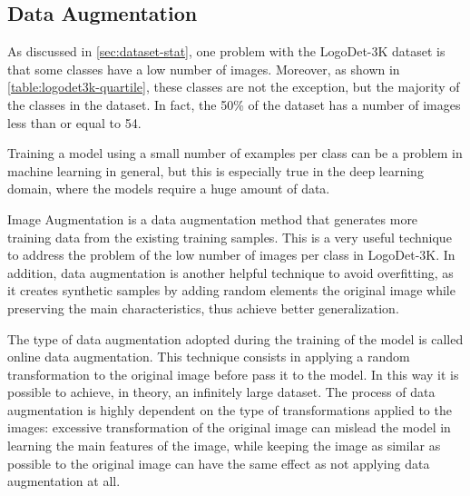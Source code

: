 \subsection{Data Augmentation}
As discussed in \autoref{sec:dataset-stat}, one problem with the LogoDet-3K dataset is that some classes have a low number of images. Moreover, as shown in \autoref{table:logodet3k-quartile}, these classes are not the exception, but the majority of the classes in the dataset. In fact, the 50\% of the dataset has a number of images less than or equal to 54.

Training a model using a small number of examples per class can be a problem in machine learning in general, but this is especially true in the deep learning domain, where the models require a huge amount of data.

Image Augmentation is a data augmentation method that generates more training data from the existing training samples. This is a very useful technique to address the problem of the low number of images per class in LogoDet-3K. In addition, data augmentation is another helpful technique to avoid overfitting, as it creates synthetic samples by adding random elements the original image while preserving the main characteristics, thus achieve better generalization.

The type of data augmentation adopted during the training of the model is called online data augmentation. This technique consists in applying a random transformation to the original image before pass it to the model. In this way it is possible to achieve, in theory, an infinitely large dataset. The process of data augmentation is highly dependent on the type of transformations applied to the images: excessive transformation of the original image can mislead the model in learning the main features of the image, while keeping the image as similar as possible to the original image can have the same effect as not applying data augmentation at all.

